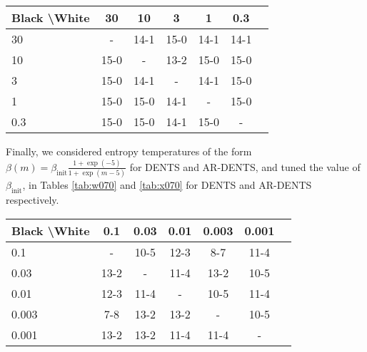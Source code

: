     \begin{table*}[]
    \centering
        \begin{tabular}{l|cccccc}
            \textbf{Black \textbackslash White}     & 30  & 10   & 3   & 1    & 0.3    \\ 
            \hline
                                    30            & -     	&  14-1 		& 15-0  		& 14-1  		& 14-1  		\\
                                    10            &  15-0 		& -     	&  13-2		& 15-0  		&  15-0 		\\
                                    3          &  15-0  	&   14-1 	&   -   &  14-1 		&  15-0 		\\
                                    1          &   	15-0	&  15-0 		&  14-1 		& -     	& 15-0  		\\
                                    0.3         &   15-0		&   	15-0	&   14-1		& 15-0  		&   -   	\\    
        \end{tabular}
        \caption{Results for round robin to select the temperature parameter $\alpha$ for AR-TENTS. The value of 3.0 won the most matches so was selected. \label{tab:x060}}
    \end{table*}
    
    
    
    
    
    
    
    
    
    
    Finally, we considered entropy temperatures of the form $\beta(m)=\beta_{\text{init}}\frac{1+\exp(-5)}{1+\exp(m-5)}$ for DENTS and AR-DENTS, and tuned the value of $\beta_{\text{init}}$, in Tables \ref{tab:w070} and \ref{tab:x070} for DENTS and AR-DENTS respectively.
    
    
    \begin{table*}[]
    \centering
        \begin{tabular}{l|cccccc}
            \textbf{Black \textbackslash White}     & 0.1  & 0.03   & 0.01   & 0.003    & 0.001    \\ 
            \hline
                                    0.1            & - & 10-5 & 12-3 & 8-7 & 11-4  		\\
                                    0.03            & 13-2 & - & 11-4 & 13-2  & 10-5   		\\
                                    0.01            & 12-3 & 11-4 & - & 10-5 & 11-4  		\\
                                    0.003            & 7-8 & 13-2 & 13-2 & - & 10-5  		\\
                                    0.001           & 13-2 & 13-2 & 11-4 & 11-4 &  - 		\\
        \end{tabular}
        \caption{Results for round robin to select the initial entropy temperature $\beta_{\text{init}}$ for DENTS. The value of 0.3 won the most matches so was selected. \label{tab:w070}}
    \end{table*}
    
